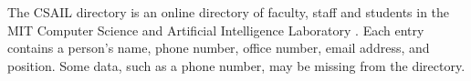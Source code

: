 The CSAIL directory is an online directory of faculty, staff and students in the MIT Computer Science and Artificial Intelligence Laboratory \cite{CSAILDirectory}.
Each entry contains a person's name, phone number, office number, email address, and position.
Some data, such as a phone number, may be missing from the directory.


